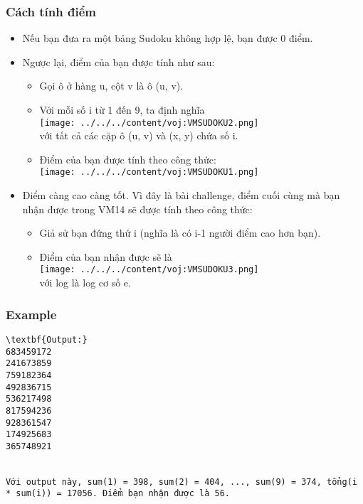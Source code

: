 \subsubsection{Cách tính điểm}
\begin{itemize}
	\item Nếu bạn đưa ra một bảng Sudoku không hợp lệ, bạn được 0 điểm.
	\item Ngược lại, điểm của bạn được tính như sau:
\begin{itemize}
	\item Gọi ô ở hàng u, cột v là ô (u, v).
	\item Với mỗi số i từ 1 đến 9, ta định nghĩa
\\
\texttt{[image: ../../../content/voj:VMSUDOKU2.png]}
\\với tất cả các cặp ô (u, v) và (x, y) chứa số i.
	\item Điểm của bạn được tính theo công thức:
\\
\texttt{[image: ../../../content/voj:VMSUDOKU1.png]}
\end{itemize}
	\item Điểm càng cao càng tốt. Vì đây là bài challenge, điểm cuối cùng mà bạn nhận được trong VM14 sẽ được tính theo công thức:
\begin{itemize}
	\item Giả sử bạn đứng thứ i (nghĩa là có i-1 người điểm cao hơn bạn).
	\item Điểm của bạn nhận được sẽ là
\\
\texttt{[image: ../../../content/voj:VMSUDOKU3.png]}
\\với log là log cơ số e.
\end{itemize}
\end{itemize}

\subsubsection{Example}
\begin{verbatim}
\textbf{Output:}
683459172
241673859
759182364
492836715
536217498
817594236
928361547
174925683
365748921


Với output này, sum(1) = 398, sum(2) = 404, ..., sum(9) = 374, tổng(i * sum(i)) = 17056. Điểm bạn nhận được là 56.
\end{verbatim}